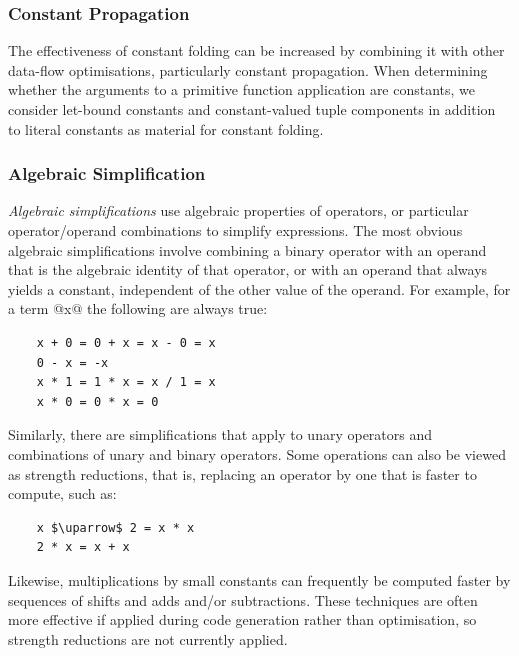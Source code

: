 

\subsubsection{Constant Propagation}

The effectiveness of constant folding can be increased by combining it with
other data-flow optimisations, particularly constant propagation. When
determining whether the arguments to a primitive function application are
constants, we consider let-bound constants and constant-valued tuple components
in addition to literal constants as material for constant folding.


\subsubsection{Algebraic Simplification}

\emph{Algebraic simplifications} use algebraic properties of operators, or
particular operator/operand combinations to simplify expressions. The most
obvious algebraic simplifications involve combining a binary operator with an
operand that is the algebraic identity of that operator, or with an operand that
always yields a constant, independent of the other value of the operand. For
example, for a term @x@ the following are always true:
%
\begin{lstlisting}[style=Haskell,numbers=none]
%\bf$\langle$ algebraic simplification $\rangle$%
    x + 0 = 0 + x = x - 0 = x
    0 - x = -x
    x * 1 = 1 * x = x / 1 = x
    x * 0 = 0 * x = 0
\end{lstlisting}
%
Similarly, there are simplifications that apply to unary operators and
combinations of unary and binary operators. Some operations can also be viewed
as strength reductions, that is, replacing an operator by one that is faster to
compute, such as:
%
\begin{lstlisting}[style=Haskell,numbers=none,mathescape]
%\bf$\langle$ strength reduction $\rangle$%
    x $\uparrow$ 2 = x * x
    2 * x = x + x
\end{lstlisting}
%
Likewise, multiplications by small constants can frequently be computed faster
by sequences of shifts and adds and/or subtractions. These techniques are often
more effective if applied during code generation rather than optimisation, so
strength reductions are not currently applied.


